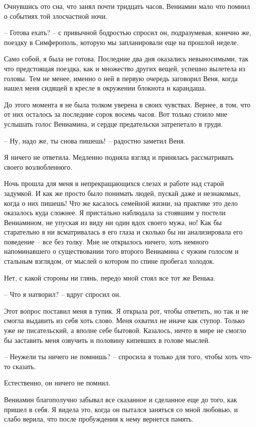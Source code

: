 \documentclass[
]{book}
\begin{document}
Очнувшись ото сна, что занял почти тридцать часов, Вениамин мало что помнил о событиях той злосчастной ночи.

-- Готова ехать? -- с привычной бодростью спросил он, подразумевая, конечно же, поездку в Симферополь, которую мы запланировали еще на прошлой неделе.

Само собой, я была не готова. Последние два дня оказались невыносимыми, так что предстоящая поездка, как и множество других вещей, успешно вылетела из головы. Тем не менее, именно о ней в первую очередь заговорил Веня, когда нашел меня сидящей в кресле в окружении блокнота и карандаша.

До этого момента я не была толком уверена в своих чувствах. Вернее, в том, что от них осталось за последние сорок восемь часов. Вот только стоило мне услышать голос Вениамина, и сердце предательски затрепетало в груди.

-- Ну, надо же, ты снова пишешь! -- радостно заметил Веня.

Я ничего не ответила. Медленно подняла взгляд и принялась рассматривать своего возлюбленного.

Ночь прошла для меня в непрекращающихся слезах и работе над старой задумкой. И как же просто было понимать людей, пускай даже и незнакомых, когда о них пишешь! Что же касалось семейной жизни, на практике это дело оказалось куда сложнее. Я пристально наблюдала за стоявшим у постели Вениамином, не упуская из виду ни один вдох своего мужа, но! Как бы старательно я ни всматривалась в его глаза и сколько бы ни анализировала его поведение -- все без толку. Мне не открылось ничего, хоть немного напоминавшего о существовании того второго Вениамина с чужим голосом и стальным взглядом, от мыслей о котором по спине пробегал холодок.

Нет, с какой стороны ни глянь, передо мной стоял все тот же Венька.

-- Что я натворил? -- вдруг спросил он.

Этот вопрос поставил меня в тупик. Я открыла рот, чтобы ответить, но так и не смогла выдавить из себя хоть слово. Меня охватил не иначе как ступор. Только уже не писательский, а вполне себе бытовой. Казалось, ничто в мире не смогло бы заставить меня озвучить и половину кипевших в голове мыслей.

-- Неужели ты ничего не помнишь? -- спросила я только для того, чтобы хоть что-то сказать.

Естественно, он ничего не помнил.

Вениамин благополучно забывал все сказанное и сделанное еще до того, как пришел в себя. Я видела это, когда он пытался заняться со мной любовью, и слабо верила, что после пробуждения к нему вернется память.
\end{document}
